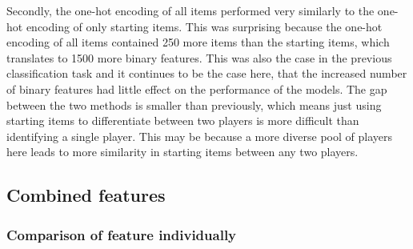 \documentclass[Report.tex]{subfiles}
\begin{document}
Secondly, the one-hot encoding of all items performed very similarly to the one-hot encoding of only starting items. This was surprising because the one-hot encoding of all items contained 250 more items than the starting items, which translates to 1500 more binary features. This was also the case in the previous classification task and it continues to be the case here, that the increased number of binary features had little effect on the performance of the models. The gap between the two methods is smaller than previously, which means just using starting items to differentiate between two players is more difficult than identifying a single player. This may be because a more diverse pool of players here leads to more similarity in starting items between any two players. 

\subsection{Combined features}

\subsubsection{Comparison of feature individually}
\end{document}
